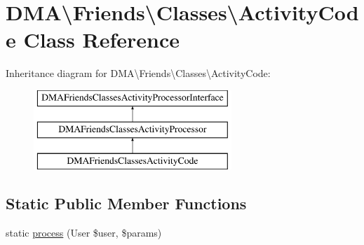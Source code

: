 \hypertarget{classDMA_1_1Friends_1_1Classes_1_1ActivityCode}{\section{D\-M\-A\textbackslash{}Friends\textbackslash{}Classes\textbackslash{}Activity\-Code Class Reference}
\label{classDMA_1_1Friends_1_1Classes_1_1ActivityCode}
}
Inheritance diagram for D\-M\-A\textbackslash{}Friends\textbackslash{}Classes\textbackslash{}Activity\-Code\-:\begin{figure}[H]
\begin{center}
\leavevmode
\includegraphics[height=3.000000cm]{d0/dbd/classDMA_1_1Friends_1_1Classes_1_1ActivityCode}
\end{center}
\end{figure}
\subsection*{Static Public Member Functions}
\begin{DoxyCompactItemize}
\item 
static \hyperlink{classDMA_1_1Friends_1_1Classes_1_1ActivityCode_aac52c5b2721f592cb941fe2d3fb516bc}{process} (User \$user, \$params)
\end{DoxyCompactItemize}


